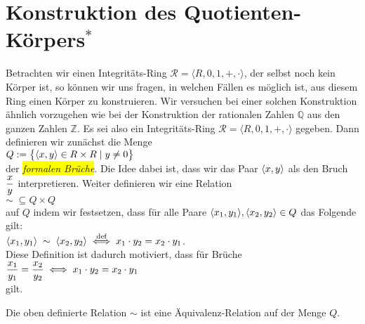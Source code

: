\section{Konstruktion des Quotienten-K\"{o}rpers$^*$}
Betrachten wir einen Integrit\"{a}ts-Ring $\mathcal{R} = \langle R, 0, 1, +, \cdot \rangle$, der selbst noch
kein K\"{o}rper ist, so k\"{o}nnen wir uns fragen, in welchen F\"{a}llen es m\"{o}glich ist, aus diesem
Ring einen K\"{o}rper zu konstruieren.  Wir versuchen bei einer solchen Konstruktion \"{a}hnlich
vorzugehen wie bei der Konstruktion der rationalen Zahlen $\mathbb{Q}$ aus den ganzen
Zahlen $\mathbb{Z}$.  Es sei also ein Integrit\"{a}ts-Ring $\mathcal{R} = \langle R, 0, 1, +, \cdot \rangle$
gegeben.  Dann definieren wir zun\"{a}chst die Menge
\\[0.2cm]
\hspace*{1.3cm}
$Q := \bigl\{ \pair(x,y) \in R \times R \mid y \not= 0 \bigr\}$
\\[0.2cm]
der \colorbox{yellow}{\emph{formalen Br\"{u}che}}.  Die Idee dabei ist, dass wir das Paar
$\pair(x,y)$ als den Bruch $\displaystyle\frac{x}{y}$ interpretieren.  Weiter definieren wir eine Relation 
\\[0.2cm]
\hspace*{1.3cm}
$\sim \;\subseteq Q \times Q$
\\[0.2cm]
auf $Q$ indem wir festsetzen, dass f\"{u}r alle Paare $\pair(x_1,y_1), \pair(x_2,y_2) \in Q$ das Folgende gilt:
\\[0.2cm]
\hspace*{1.3cm}
$\pair(x_1, y_1) \;\sim\; \pair(x_2, y_2) \df x_1 \cdot y_2 = x_2 \cdot y_1$.
\\[0.2cm]
Diese Definition ist dadurch motiviert, dass f\"{u}r Br\"{u}che 
\\[0.2cm]
\hspace*{1.3cm}
$\displaystyle \frac{x_1}{y_1} = \frac{x_2}{y_2} \;\Longleftrightarrow\; x_1 \cdot y_2 = x_2 \cdot y_1$
\\[0.2cm]
gilt.

\begin{Satz}
Die oben definierte Relation  $\sim$ ist eine \"{A}quivalenz-Relation auf der Menge $Q$.
\end{Satz}


